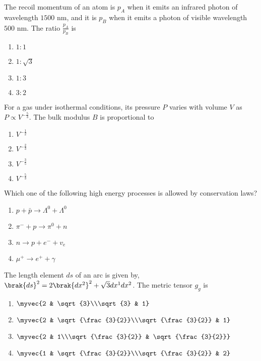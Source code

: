 \item The recoil momentum of an atom is $p_A$ when it emits an infrared photon of wavelength $1500$ nm, and it is $p_B$ when it emits a photon of visible wavelength $500$ nm. The ratio $\frac{p_A}{p_B}$ is
\hfill{}
\begin{enumerate}
\item $1:1$
\item $1:\sqrt{3}$
\item $1:3$
\item $3:2$
\end{enumerate}

\item For a gas under isothermal conditions, its pressure $P$ varies with volume $V$ as $P \propto V^{-\frac{5}{3}}$. The bulk modulus $B$ is proportional to
\hfill{}
\begin{enumerate}
\item $V^{-\frac{1}{2}}$
\item $V^{-\frac{2}{3}}$
\item $V^{-\frac{3}{5}}$
\item $V^{-\frac{5}{3}}$
\end{enumerate}

\item Which one of the following high energy processes is allowed by conservation laws?
\hfill{}
\begin{enumerate}
\item $p + \bar{p} \to \Lambda^0 + \Lambda^0$
\item $\pi^- + p \to \pi^0 + n$
\item $n \to p + e^- + v_e$
\item $\mu^+ \to e^+ + \gamma$
\end{enumerate}

\item The length element $ds$ of an arc is given by, $\brak{ds}^2 = 2\brak{dx^2}^2 + \sqrt{3}dx^1dx^2$. The metric tensor $g_g$ is
\hfill{}
\begin{enumerate}
\item $\myvec{2 & \sqrt{3}\\\sqrt{3} & 1}$
\item $\myvec{2 & \sqrt{\frac{3}{2}}\\\sqrt{\frac{3}{2}} & 1}$
\item $\myvec{2 & 1\\\sqrt{\frac{3}{2}} & \sqrt{\frac{3}{2}}}$
\item $\myvec{1 & \sqrt{\frac{3}{2}}\\\sqrt{\frac{3}{2}} & 2}$
\end{enumerate}

